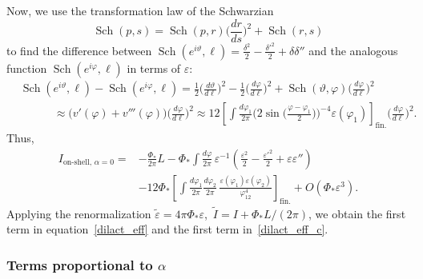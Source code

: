 \documentclass[12pt]{article}
\DeclareMathOperator{\Sch}{Sch}
\newcommand{\de}{\delta}
\newcommand{\vt}{\vartheta}
\newcommand{\vep}{\varepsilon}
\newcommand{\tvep}{\tilde{\varepsilon}}
\newcommand{\vp}{\varphi}
\begin{document}
Now, we use the transformation law of the Schwarzian
\begin{equation}
\Sch(p,s)=\Sch(p,r)\biggl(\frac{dr}{ds}\biggr)^2+\Sch(r,s)
\end{equation}
to find the difference between $\Sch(e^{i\vt},\ell)=\frac{\de^2}{2}-\frac{\de'^2}{2}+\de\de''$ and the analogous function $\Sch(e^{i\vp},\ell)$ in terms of $\vep$:
\begin{equation}
\begin{aligned}
&\Sch(e^{i\vt},\ell)-\Sch(e^{i\vp},\ell)
=\frac{1}{2}\biggl(\frac{d\vt}{d\ell}\biggr)^2
-\frac{1}{2}\biggl(\frac{d\vp}{d\ell}\biggr)^2
+\Sch(\vt,\vp)\biggl(\frac{d\vp}{d\ell}\biggr)^2\\[2pt]
&\qquad\quad
\approx\bigl(v'(\vp) + v'''(\vp)\bigr)\biggl(\frac{d\vp}{d\ell}\biggr)^2
\approx 12\left[\int\frac{d\vp_1}{2\pi}
\biggl(2\sin\biggl(\frac{\vp-\vp_1}{2}\biggr)\biggr)^{-4}
\vep(\vp_1)\right]_{\text{fin.}}
\biggl(\frac{d\vp}{d\ell}\biggr)^2.
\end{aligned}
\end{equation}
Thus,
\begin{equation}\label{osdilact0f}
\begin{aligned}
I_{\text{on-shell},\,\alpha=0}
=&-\frac{\Phi_*}{2\pi}L
-\Phi_*\int \frac{d\vp}{2\pi}\,\vep^{-1}
\left(\frac{\vep^2}{2}-\frac{\vep'^2}{2}+\vep\vep''\right)\\[3pt]
&-12\Phi_*\left[\int\frac{d\vp_1}{2\pi}\frac{d\vp_2}{2\pi}\,
\frac{\vep(\vp_1)\vep(\vp_2)}{\vp_{12}^4}\right]_{\text{fin.}}
+O(\Phi_*\vep^3).
\end{aligned}
\end{equation}
Applying the renormalization $\tvep=4\pi\Phi_*\vep$,\, $\tilde{I}=I+\Phi_*L/(2\pi)$, we obtain the first term in equation~\eqref{dilact_eff} and the first term in~\eqref{dilact_eff_c}.

\subsubsection{Terms proportional to $\alpha$}
\end{document}
